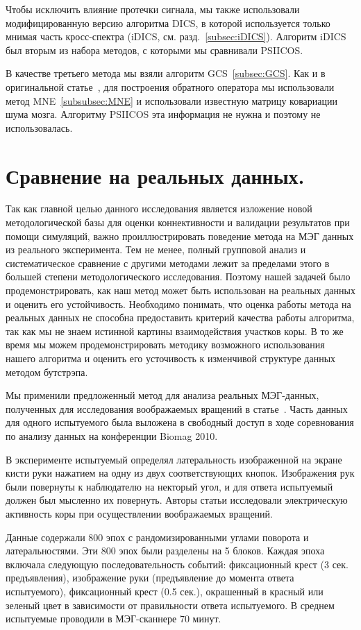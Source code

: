 Чтобы исключить влияние протечки сигнала, мы также использовали
модифицированную версию алгоритма DICS, в которой используется только мнимая
часть кросс-спектра (iDICS, см. разд.~\ref{subsec:iDICS}). Алгоритм iDICS был
вторым из набора методов, с которыми мы сравнивали PSIICOS.\@

В качестве третьего метода мы взяли алгоритм GCS~\ref{subsec:GCS}.  Как и в
оригинальной статье~\cite{Wens2015}, для построения обратного оператора мы
использовали метод MNE~\ref{subsubsec:MNE} и использовали известную матрицу
ковариации шума мозга. Алгоритму PSIICOS эта информация не нужна и поэтому не
использовалась.

\section{Сравнение на реальных данных.}\label{sec:validation_on_real_data}
Так как главной целью данного
исследования является изложение новой методологической базы для оценки
коннективности и валидации результатов при помощи симуляций, важно
проиллюстрировать поведение метода на МЭГ данных из реального эксперимента.
Тем не менее, полный групповой анализ и систематическое сравнение с другими
методами лежит за пределами этого в большей степени методологического исследования.
Поэтому нашей задачей было продемонстрировать, как наш метод может быть использован на
реальных данных и оценить его устойчивость.
Необходимо понимать, что оценка работы метода на
реальных данных не способна предоставить критерий качества работы алгоритма, так как
мы не знаем истинной картины взаимодействия участков коры. В то же время мы можем
продемонстрировать методику возможного использования нашего алгоритма и оценить
его усточивость к изменчивой структуре данных методом бутстрэпа.

Мы применили предложенный метод для анализа реальных МЭГ-данных, полученных для
исследования воображаемых вращений в статье~\cite{DeLange2008}. Часть данных
для одного испытуемого была выложена в свободный доступ в ходе соревнования по
анализу данных на конференции Biomag 2010.

В эксперименте испытуемый определял латеральность изображенной на экране кисти
руки нажатием на одну из двух соответствующих кнопок.  Изображения рук были
повернуты к наблюдателю на некторый угол, и для ответа испытуемый должен был
мысленно их повернуть. Авторы статьи исследовали электрическую активность коры
при осуществлении воображаемых вращений.

Данные содержали 800 эпох с рандомизированными углами поворота и
латеральностями. Эти 800 эпох были разделены на 5 блоков. Каждая эпоха включала
следующую последовательность событий: фиксационный крест (3 сек. предъявления),
изображение руки (предъявление до момента ответа испытуемого), фиксационный
крест (0.5 сек.), окрашенный в красный или зеленый цвет в зависимости от
правильности ответа испытуемого. В среднем испытуемые проводили в МЭГ-сканнере
70 минут.

